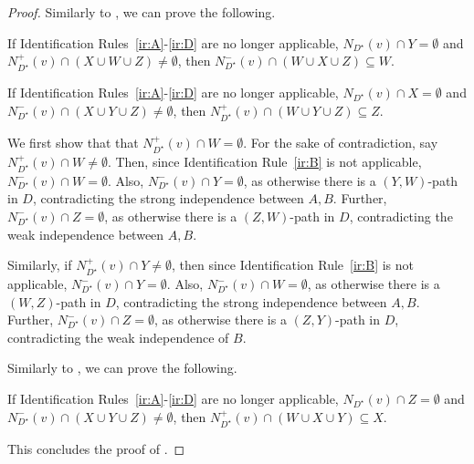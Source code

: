 \begin{proof}
Similarly to , we can prove the following.

\begin{claim}\label{claim:ordered-ir6}
If Identification Rules~\ref{ir:A}-\ref{ir:D} are no longer applicable, $N_{D^{\star}}(v) \cap Y=\emptyset$ and  $N_{D^{\star}}^+(v) \cap (X \cup W \cup Z) \neq \emptyset$, then $N_{D^{\star}}^-(v) \cap (W \cup X \cup Z) \subseteq W$.
\end{claim}

\begin{claim}\label{claim:ordered-ir7}
If Identification Rules~\ref{ir:A}-\ref{ir:D} are no longer applicable, $N_{D^{\star}}(v) \cap X=\emptyset$ and $N_{D^{\star}}^-(v) \cap (X \cup Y \cup Z) \neq \emptyset$, then $N_{D^{\star}}^+(v) \cap ( W \cup Y \cup Z) \subseteq Z$.
\end{claim}

\begin{claimproof}
We first show that that $N_{D^{\star}}^+(v) \cap W = \emptyset$. 
For the sake of contradiction, say $N_{D^{\star}}^+(v) \cap W \neq \emptyset$. 
Then, since Identification Rule~\ref{ir:B} is not applicable, $N_{D^{\star}}^-(v) \cap W = \emptyset$. 
Also, $N_{D^{\star}}^-(v) \cap Y = \emptyset$, as otherwise there is a $(Y,W)$-path in $D$, contradicting the strong independence between $A,B$. 
Further, $N_{D^{\star}}^-(v) \cap Z = \emptyset$, as otherwise there is a $(Z,W)$-path in $D$, contradicting the weak independence between $A,B$.

Similarly, if $N_{D^{\star}}^+(v) \cap Y \neq \emptyset$,
then since Identification Rule~\ref{ir:B} is not applicable, $N_{D^{\star}}^-(v) \cap Y = \emptyset$.  
Also,  $N_{D^{\star}}^-(v) \cap W= \emptyset$, as otherwise there is a $(W,Z)$-path in $D$, contradicting the strong independence between $A,B$. 
Further, 
$N_{D^{\star}}^-(v) \cap Z= \emptyset$, as otherwise there is a $(Z,Y)$-path in $D$, contradicting the weak independence of $B$.
\end{claimproof}

Similarly to , we can prove the following.

\begin{claim}\label{claim:ordered-ir8}
If Identification Rules~\ref{ir:A}-\ref{ir:D} are no longer applicable, $N_{D^{\star}}(v) \cap Z=\emptyset$ and $N_{D^{\star}}^-(v) \cap (X \cup Y \cup Z) \neq \emptyset$, then $N_{D^{\star}}^+(v) \cap ( W \cup X \cup Y) \subseteq X$.
\end{claim}
This concludes the proof of .
\end{proof}

